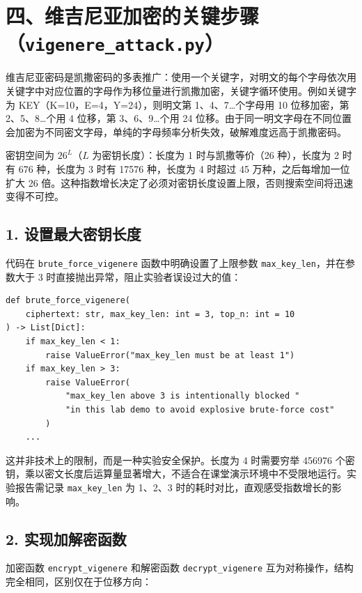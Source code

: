 \documentclass[12pt, a4paper]{article}
\begin{document}
\section{四、维吉尼亚加密的关键步骤（\texttt{vigenere\_attack.py}）}

维吉尼亚密码是凯撒密码的多表推广：使用一个关键字，对明文的每个字母依次用关键字中对应位置的字母作为移位量进行凯撒加密，关键字循环使用。例如关键字为 KEY（K=10，E=4，Y=24），则明文第 1、4、7\ldots 个字母用 10 位移加密，第 2、5、8\ldots 个用 4 位移，第 3、6、9\ldots 个用 24 位移。由于同一明文字母在不同位置会加密为不同密文字母，单纯的字母频率分析失效，破解难度远高于凯撒密码。

密钥空间为 $26^L$（$L$ 为密钥长度）：长度为 1 时与凯撒等价（26 种），长度为 2 时有 676 种，长度为 3 时有 17576 种，长度为 4 时超过 45 万种，之后每增加一位扩大 26 倍。这种指数增长决定了必须对密钥长度设置上限，否则搜索空间将迅速变得不可控。

\subsection{1. 设置最大密钥长度}

代码在 \texttt{brute\_force\_vigenere} 函数中明确设置了上限参数 \texttt{max\_key\_len}，并在参数大于 3 时直接抛出异常，阻止实验者误设过大的值：

\begin{lstlisting}[style=python, caption={维吉尼亚穷举函数入口（vigenere\_attack.py）}]
def brute_force_vigenere(
    ciphertext: str, max_key_len: int = 3, top_n: int = 10
) -> List[Dict]:
    if max_key_len < 1:
        raise ValueError("max_key_len must be at least 1")
    if max_key_len > 3:
        raise ValueError(
            "max_key_len above 3 is intentionally blocked "
            "in this lab demo to avoid explosive brute-force cost"
        )
    ...
\end{lstlisting}

这并非技术上的限制，而是一种实验安全保护。长度为 4 时需要穷举 456976 个密钥，乘以密文长度后运算量显著增大，不适合在课堂演示环境中不受限地运行。实验报告需记录 \texttt{max\_key\_len} 为 1、2、3 时的耗时对比，直观感受指数增长的影响。

\subsection{2. 实现加解密函数}

加密函数 \texttt{encrypt\_vigenere} 和解密函数 \texttt{decrypt\_vigenere} 互为对称操作，结构完全相同，区别仅在于位移方向：
\end{document}
